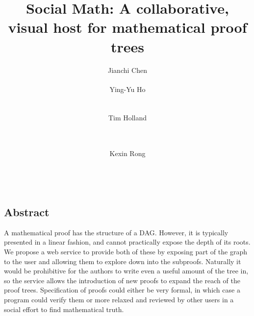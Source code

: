 \documentclass{acm_proc_article-sp}
\begin{document}
\title{\Large \bf Social Math: A collaborative, visual host for mathematical proof trees}
%
\author{
\alignauthor
Jianchi Chen\\
       \\
\alignauthor
Ying-Yu Ho\\
       \\
       \\
\alignauthor
Tim Holland\\
       \\
       \\
\and  %
\alignauthor 
Kexin Rong\\
       \\
      \\
}

\maketitle

\thispagestyle{empty}

\subsection*{Abstract}
A mathematical proof has the structure of a DAG. However, it is typically
presented in a linear fashion, and cannot practically expose the depth of its
roots. We propose a web service to provide both of these by exposing part of
the graph to the user and allowing them to explore down into the subproofs.
Naturally it would be prohibitive for the authors to write even a useful amount
of the tree in, so the service allows the introduction of new proofs to expand
the reach of the proof trees. Specification of proofs could either be very
formal, in which case a program could verify them or more relaxed and reviewed
by other users in a social effort to find mathematical truth.
\end{document}
